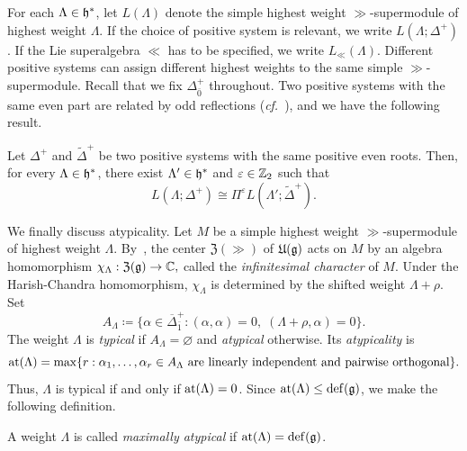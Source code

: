 For each $\Lambda\in{\mathfrak h}^{\ast}$, let $L(\Lambda)$ denote the simple highest weight $\gg$-supermodule of highest weight $\Lambda$. If the choice of positive system is relevant, we write $L(\Lambda;\Delta^+)$. If the Lie superalgebra $\ll$ has to be specified, we write $L_{\ll}(\Lambda)$. Different positive systems can assign different highest weights to the same simple $\gg$-supermodule. Recall that we fix $\Delta_{\bar{0}}^{+}$ throughout. Two positive systems with the same even part are related by odd reflections (\emph{cf.}~\cite{Serganova_reps}), and we have the following result.

\begin{lemma}\label{lemm::odd_reflections_HW}
Let $\Delta^+$ and $\widetilde{\Delta}^+$ be two positive systems with the same positive even roots. Then, for every $\Lambda\in{\mathfrak h}^{\ast}$, there exist $\Lambda'\in{\mathfrak h}^{\ast}$ and $\varepsilon\in{\mathbb Z}_2$ such that
\begin{equation*}
L(\Lambda;\Delta^+)
\cong
\Pi^\varepsilon L(\Lambda';\widetilde{\Delta}^+).
\end{equation*}
\end{lemma}

We finally discuss atypicality. Let $M$ be a simple highest weight $\gg$-supermodule of highest weight $\Lambda$. By~\cite[Section~8.2.4]{musson2012lie}, the center $\mathfrak{Z}(\gg)$ of ${\mathfrak U}({\mathfrak{g}})$ acts on $M$ by an algebra homomorphism
$
\chi_\Lambda:\mathfrak{Z}({\mathfrak{g}})\to{\mathbb C},
$
called the \emph{infinitesimal character} of $M$. Under the Harish-Chandra homomorphism, $\chi_\Lambda$ is determined by the shifted weight $\Lambda+\rho$. Set
\begin{equation}
A_\Lambda
\coloneqq
\{\alpha\in\overline{\Delta}_{\bar1}^+:(\alpha,\alpha)=0,\;(\Lambda+\rho,\alpha)=0\}.
\end{equation}
The weight $\Lambda$ is \emph{typical} if $A_\Lambda=\varnothing$ and \emph{atypical} otherwise. Its \emph{atypicality} is
\begin{equation}
{\operatorname{at}}(\Lambda)
=
\max\{r:\alpha_1,\ldots,\alpha_r\in A_\Lambda
\text{ are linearly independent and pairwise orthogonal}\}.
\end{equation}
Thus, $\Lambda$ is typical if and only if ${\operatorname{at}}(\Lambda)=0$. Since
${\operatorname{at}}(\Lambda)\leq{\mathrm{def}}({\mathfrak{g}})$, we make the following definition.

\begin{definition}
A weight $\Lambda$ is called \emph{maximally atypical} if
${\operatorname{at}}(\Lambda)={\mathrm{def}}({\mathfrak{g}})$.
\end{definition}

